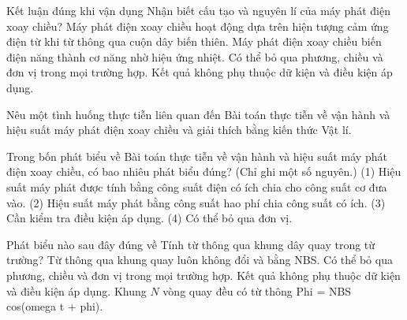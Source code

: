 \begin{ex}
Kết luận đúng khi vận dụng Nhận biết cấu tạo và nguyên lí của máy phát điện xoay chiều?
\choice
{\True Máy phát điện xoay chiều hoạt động dựa trên hiện tượng cảm ứng điện từ khi từ thông qua cuộn dây biến thiên.}
{Máy phát điện xoay chiều biến điện năng thành cơ năng nhờ hiệu ứng nhiệt.}
{Có thể bỏ qua phương, chiều và đơn vị trong mọi trường hợp.}
{Kết quả không phụ thuộc dữ kiện và điều kiện áp dụng.}
\end{ex}

\begin{bt}
Nêu một tình huống thực tiễn liên quan đến Bài toán thực tiễn về vận hành và hiệu suất máy phát điện xoay chiều và giải thích bằng kiến thức Vật lí.
\end{bt}

\begin{ex}
Trong bốn phát biểu về Bài toán thực tiễn về vận hành và hiệu suất máy phát điện xoay chiều, có bao nhiêu phát biểu đúng? (Chỉ ghi một số nguyên.) (1) Hiệu suất máy phát được tính bằng công suất điện có ích chia cho công suất cơ đưa vào. (2) Hiệu suất máy phát bằng công suất hao phí chia công suất có ích. (3) Cần kiểm tra điều kiện áp dụng. (4) Có thể bỏ qua đơn vị.
\end{ex}

\begin{ex}
Phát biểu nào sau đây đúng về Tính từ thông qua khung dây quay trong từ trường?
\choice
{Từ thông qua khung quay luôn không đổi và bằng NBS.}
{Có thể bỏ qua phương, chiều và đơn vị trong mọi trường hợp.}
{Kết quả không phụ thuộc dữ kiện và điều kiện áp dụng.}
{\True Khung $N$ vòng quay đều có từ thông Phi = NBS cos(omega t + phi).}
\end{ex}

